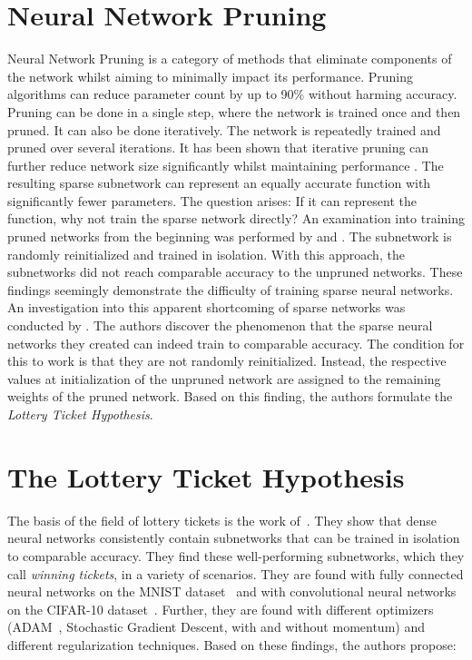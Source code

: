 \section{Neural Network Pruning}
Neural Network Pruning is a category of methods that eliminate components of the network whilst aiming to minimally impact its performance.
Pruning algorithms can reduce parameter count by up to 90\% without harming accuracy.
\autocite{LeCun, OptimalBrainSurgeon, HanEtAl15, PruningFiltersForEfficientConvets}
Pruning can be done in a single step, where the network is trained once and then pruned.
It can also be done iteratively. 
The network is repeatedly trained and pruned over several iterations. 
It has been shown that iterative pruning can further reduce network size significantly whilst maintaining performance \autocite{HanEtAl15}.
The resulting sparse subnetwork can represent an equally accurate function with significantly fewer parameters. 
The question arises: If it can represent the function, why not train the sparse network directly?
An examination into training pruned networks from the beginning was performed by \textcite{PruningFiltersForEfficientConvets} and \textcite{HanEtAl15}.
The subnetwork is randomly reinitialized and trained in isolation.
With this approach, the subnetworks did not reach comparable accuracy to the unpruned networks.
These findings seemingly demonstrate the difficulty of training sparse neural networks.
An investigation into this apparent shortcoming of sparse networks was conducted by \textcite{LTH}.
The authors discover the phenomenon that the sparse neural networks they created can indeed train to comparable accuracy.
The condition for this to work is that they are not randomly reinitialized. 
Instead, the respective values at initialization of the unpruned network are assigned to the remaining weights of the pruned network. 
Based on this finding, the authors formulate the \textit{Lottery Ticket Hypothesis}.

\section{The Lottery Ticket Hypothesis}\label{sec:lth}
The basis of the field of lottery tickets is the work of~\cite{LTH}. 
They show that dense neural networks consistently contain subnetworks that can be trained in isolation to comparable accuracy.
They find these well-performing subnetworks, which they call \textit{winning tickets}, in a variety of scenarios.
They are found with fully connected neural networks on the MNIST dataset~\autocite{mnist} and with convolutional neural networks~\autocite{cnn} on the CIFAR-10 dataset~\autocite{cifar}.
Further, they are found with different optimizers (ADAM~\autocite{ADAM}, Stochastic Gradient Descent, with and without momentum) and different regularization techniques.
Based on these findings, the authors propose:

